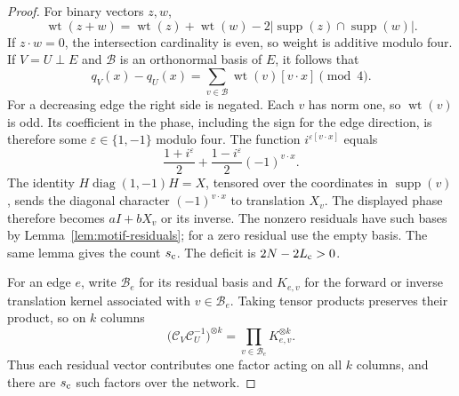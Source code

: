 \begin{proof}
For binary vectors $z,w$,
\[
 \operatorname{wt}(z+w)
 =\operatorname{wt}(z)+\operatorname{wt}(w)
       -2|\operatorname{supp}(z)\cap\operatorname{supp}(w)|.
\]
If $z\cdot w=0$, the intersection cardinality is even, so weight is
additive modulo four.  If $V=U\mathbin{\perp}E$ and $\mathcal B$
is an orthonormal basis of $E$, it follows that
\[
 q_V(x)-q_U(x)=\sum_{v\in\mathcal B}
                 \operatorname{wt}(v)[v\cdot x]\pmod4.
\]
For a decreasing edge the right side is negated.
Each $v$ has norm one, so $\operatorname{wt}(v)$ is odd.  Its
coefficient in the phase, including the sign for the edge direction,
is therefore some $\varepsilon\in\{1,-1\}$ modulo four.  The function
$i^{\varepsilon[v\cdot x]}$ equals
\[
 \frac{1+i^\varepsilon}{2}
 +\frac{1-i^\varepsilon}{2}(-1)^{v\cdot x}.
\]
The identity $H\operatorname{diag}(1,-1)H=X$, tensored over the
coordinates in $\operatorname{supp}(v)$, sends the diagonal character
$(-1)^{v\cdot x}$ to translation $X_v$.  The displayed phase therefore
becomes $aI+bX_v$ or its inverse.  The nonzero residuals have such
bases by Lemma~\ref{lem:motif-residuals}; for a zero residual use the
empty basis.  The same lemma gives the count $s_{\rm c}$.
The deficit is $2N-2L_{\rm c}>0$.

For an edge $e$, write $\mathcal B_e$ for its residual basis and
$K_{e,v}$ for the forward or inverse translation kernel associated
with $v\in\mathcal B_e$.  Taking tensor products preserves their
product, so on $k$ columns
\[
 \bigl(\mathcal C_V\mathcal C_U^{-1}\bigr)^{\otimes k}
 =\prod_{v\in\mathcal B_e}K_{e,v}^{\otimes k}.
\]
Thus each residual vector contributes one factor acting on all $k$
columns, and there are $s_{\rm c}$ such factors over the network.


\end{proof}

